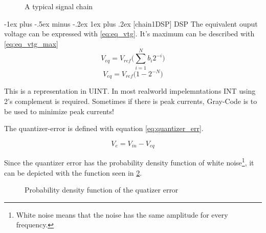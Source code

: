 \documentclass[10pt,landscape]{article}
\makeatletter
\newcommand*\circled[1]{\tikz[baseline=(char.base)]{
            \node[shape=circle,draw,inner sep=2pt] (char) {#1};}}
\renewcommand{\subsubsection}{\@startsection{subsubsection}{3}{0mm}%
                                {-1ex plus -.5ex minus -.2ex}%
                                {1ex plus .2ex}%
                                {\normalfont\small\bfseries}}
\makeatother
\begin{document}
\begin{multicols}{2}
\begin{figure}[H]
\begin{center}
\begin{circuitikz}[x=0.021\linewidth,y=0.021\linewidth]
        \end{circuitikz}
    \end{center}
    \caption{A typical signal chain}
    \label{fig:chain}
\end{figure}

\subsubsection[chain1DSP]{\circled{1} DSP}
The equivalent ouput voltage can be expressed with \ref{eq:eq_vtg}. It's maximum can be described with \ref{eq:eq_vtg_max}
\begin{equation}
    V_{eq} = V_{ref} \Big(\sum^N_{i=1}b_i 2^{-i}\Big)
    \label{eq:eq_vtg}
\end{equation}
\begin{equation}
    V_{eq} = V_{ref}\Big(1 - 2^{-N}\Big)
    \label{eq:eq_vtg_max}
\end{equation}

This is a representation in UINT. In most realworld impelemntations INT using 2's complement is required. Sometimes if there is peak currents, Gray-Code is to be used to minimize peak currents!

The quantizer-error is defined with equation \ref{eq:quantizer_err}.

\begin{equation}
    V_{e} = V_{in} - V_{eq}
    \label{eq:quantizer_err}
\end{equation}

Since the quantizer error has the probability density function of white noise\footnote{White noise means that the noise has the same amplitude for every frequency.}, it can be depicted with the function seen in \ref{fig:prob_dens_func_quantizer}.

\begin{figure}[H]
    \centering
    \caption{Probability density function of the quatizer error}
    \label{fig:prob_dens_func_quantizer}
\end{figure}


\end{multicols}
\end{document}
